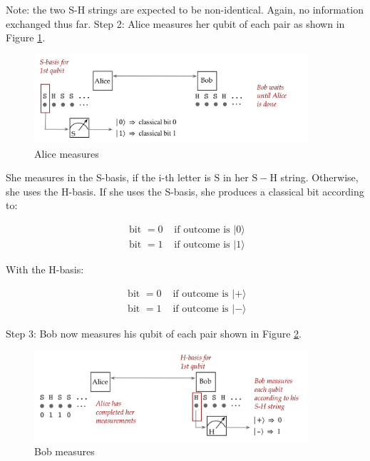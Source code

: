 \documentclass[main.tex]{subfiles}
\begin{document}
    Note: the two S-H strings are expected to be non-identical. Again, no information exchanged thus far. Step 2: Alice measures her qubit of each pair as shown in Figure \ref{fig:14ekert4}.
    
    \begin{figure}
        \centering
        \includegraphics[width=4in]{notes/figs/n06/14ekert4.png}
        \caption{Alice measures}
        \label{fig:14ekert4}
    \end{figure}
    
    She measures in the S-basis, if the i-th letter is $\mathrm{S}$ in her $\mathrm{S}-\mathrm{H}$ string. Otherwise, she uses the H-basis. If she uses the S-basis, she produces a classical bit according to:
    
    $$
    \begin{array}{ll}
    \text { bit }=0 & \text { if outcome is }|0\rangle \\
    \text { bit }=1 & \text { if outcome is }|1\rangle
    \end{array}
    $$
    
    With the H-basis:
    
    $$
    \begin{array}{ll}
    \text { bit }=0 & \text { if outcome is }|+\rangle \\
    \text { bit }=1 & \text { if outcome is }|-\rangle
    \end{array}
    $$
    
    Step 3: Bob now measures his qubit of each pair shown in Figure \ref{fig:15ekert5}.
    
    \begin{figure}
        \centering
        \includegraphics[width=4in]{notes/figs/n06/15ekert5.png}
        \caption{Bob measures}
        \label{fig:15ekert5}
    \end{figure}
    
\end{document}

